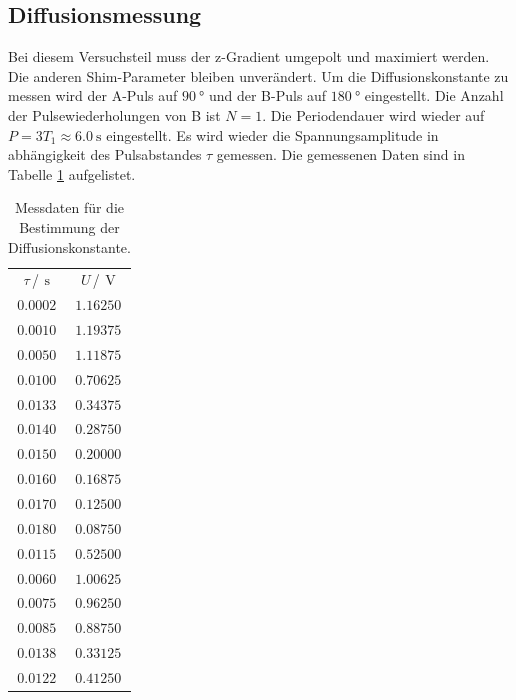 \subsection{Diffusionsmessung}
Bei diesem Versuchsteil muss der z-Gradient umgepolt und maximiert werden. Die anderen Shim-Parameter bleiben unverändert. 
Um die Diffusionskonstante zu messen wird der A-Puls auf $\SI{90}{\degree}$ und der B-Puls auf $\SI{180}{\degree}$ eingestellt.
Die Anzahl der Pulsewiederholungen von B ist $N=1$. Die Periodendauer wird wieder auf $P=3T_{\text{1}}\approx \SI{6.0}{\second}$ 
eingestellt.
Es wird wieder die Spannungsamplitude in abhängigkeit des Pulsabstandes $\tau$ gemessen.
Die gemessenen Daten sind in Tabelle \ref{tab:Diff_messung} aufgelistet. 
\begin{table}
  \centering
  \caption{Messdaten für die Bestimmung der Diffusionskonstante.}
  \label{tab:Diff_messung}
  \begin{tabular}{c c}
    \toprule
    $\tau$\,/\,$\SI{}{\second}$&$U$\,/\,$\SI{}{\volt}$\\
    $\num{0.0002}$&$\num{1.16250}$\\
    $\num{0.0010}$&$\num{1.19375}$\\
    $\num{0.0050}$&$\num{1.11875}$\\
    $\num{0.0100}$&$\num{0.70625}$\\
    $\num{0.0133}$&$\num{0.34375}$\\
    $\num{0.0140}$&$\num{0.28750}$\\
    $\num{0.0150}$&$\num{0.20000}$\\
    $\num{0.0160}$&$\num{0.16875}$\\
    $\num{0.0170}$&$\num{0.12500}$\\
    $\num{0.0180}$&$\num{0.08750}$\\
    $\num{0.0115}$&$\num{0.52500}$\\
    $\num{0.0060}$&$\num{1.00625}$\\
    $\num{0.0075}$&$\num{0.96250}$\\
    $\num{0.0085}$&$\num{0.88750}$\\
    $\num{0.0138}$&$\num{0.33125}$\\
    $\num{0.0122}$&$\num{0.41250}$\\
    \bottomrule
  \end{tabular}
\end{table}
